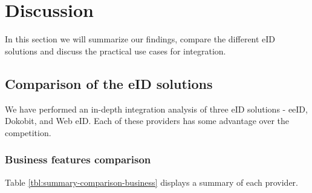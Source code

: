 \section{Discussion}

In this section we will summarize our findings, compare the different eID solutions and discuss the practical use cases for integration.

\subsection{Comparison of the eID solutions}

We have performed an in-depth integration analysis of three eID solutions - eeID, Dokobit, and Web eID. Each of these providers has some advantage over the competition.

\subsubsection{Business features comparison}

Table \ref{tbl:summary-comparison-business} displays a summary of each provider.

